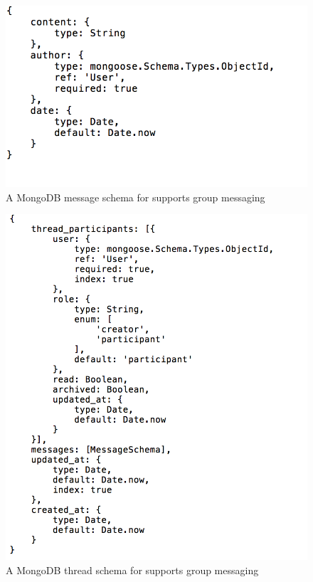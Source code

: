 \documentclass[12pt]{article}
\begin{document}
\begin{figure}
\begin{center}
        \includegraphics[scale=0.8]{resources/message_schema.png}
\end{center}
\caption{\label{figcaption} A MongoDB message schema for supports group messaging}
\end{figure}

\begin{figure}
\begin{center}
        \includegraphics[scale=0.8]{resources/thread_schema.png}
\end{center}
\caption{\label{figcaption} A MongoDB thread schema for supports group messaging}
\end{figure}
\end{document}
